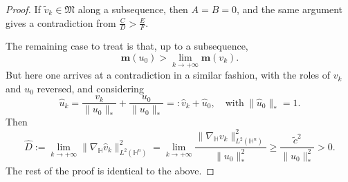 \documentclass[11pt]{article}
\begin{document}
\begin{proof}
{If $\tilde v_k\in\mathfrak M$ along a subsequence, then $A=B=0$, and the same argument gives a contradiction from $\frac{C}{D}>\frac{E}{F}$.}

 The remaining case to treat is that, up to a subsequence,
\begin{equation*}
 \mathbf{m}(u_0)>\lim\limits_{k\rightarrow+\infty} \mathbf{m}(v_k).
\end{equation*}
But here one arrives at a contradiction in a similar fashion, with the roles of $v_k$ and $u_0$
reversed, and considering
\begin{equation*}
 \hat{u}_k=\frac{v_k}{\|u_0\|_*}+\frac{u_0}{\|u_0\|_*}=:\hat{v}_k+\hat{u}_{0},\quad \mathrm{with}~\|\hat{u}_0\|_*=1.
\end{equation*}
Then
\begin{equation*}
\hat{D}:=\lim\limits_{k\rightarrow+\infty}\|\nabla_\mathbb{H} \hat{v}_{k}\|_{L^2(\mathbb{H}^n)}^2=\lim\limits_{k\rightarrow+\infty}\frac{\|\nabla_\mathbb{H} {v}_{k}\|_{L^2(\mathbb{H}^n)}^2}{\|u_0\|_*^2}\geq \frac{\tilde{c}^2}{\|u_0\|_*^2}>0.
\end{equation*}
The rest of the proof is identical to the above.
\end{proof}
\end{document}
